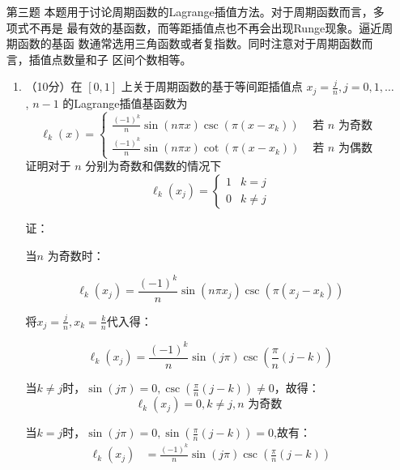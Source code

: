 \documentclass[12pt,a4paper,UTF8]{ctexart}
\theoremstyle{nonumberplain}
\begin{document}
\begin{enumerate}
\begin{enumerate}
          \end{enumerate}
    \item[第三题] 本题用于讨论周期函数的Lagrange插值方法。对于周期函数而言，多项式不再是 最有效的基函数，而等距插值点也不再会出现Runge现象。逼近周期函数的基函 数通常选用三角函数或者复指数。同时注意对于周期函数而言，插值点数量和子
          区间个数相等。
          \begin{enumerate}\item （10分）在 $[0,1]$ 上关于周期函数的基于等间距插值点 $x_{j}=\frac{j}{n}, j=0,1, \ldots$, $n-1$ 的Lagrange插值基函数为
                    $$
                        \ell_{k}(x)=\left\{\begin{array}{ll}
                            \frac{(-1)^{k}}{n} \sin (n \pi x) \csc \left(\pi\left(x-x_{k}\right)\right) & \text { 若 } n \text { 为奇数 } \\
                            \frac{(-1)^{k}}{n} \sin (n \pi x) \cot \left(\pi\left(x-x_{k}\right)\right) & \text { 若 } n \text { 为偶数 }
                        \end{array}\right.
                    $$
                    证明对于 $n$ 分别为奇数和偶数的情况下
                    $$
                        \ell_{k}\left(x_{j}\right)=\left\{\begin{array}{ll}
                            1 & k=j      \\
                            0 & k \neq j
                        \end{array}\right.
                    $$
                    \par 证：
                    \par 当$n$ 为奇数时：
                    \par $$\ell_{k}\left(x_{j}\right)=\frac{(-1)^{k}}{n} \sin (n \pi x_{j}) \csc \left(\pi\left(x_{j}-x_{k}\right)\right)$$
                    \par 将$x_{j}=\frac{j}{n},x_{k}=\frac{k}{n}$代入得：
                    \par $$\ell_{k}\left(x_{j}\right)=\frac{(-1)^{k}}{n} \sin (j \pi ) \csc \left(\frac{\pi}{n}\left(j-k\right)\right)$$
                    \par 当$k \neq j$时，$\sin (j \pi )=0,\csc \left(\frac{\pi}{n}\left(j-k\right)\right)\neq 0$，故得：
                    $$\ell_{k}\left(x_{j}\right)=0,k \neq j,n \text { 为奇数 }$$
                    \par 当$k=j$时，$\sin (j \pi )=0,\sin \left(\frac{\pi}{n}\left(j-k\right)\right)= 0$,故有：
                    $$\begin{aligned}\ell_{k}\left(x_{j}\right) & =\frac{(-1)^{k}}{n} \sin (j \pi ) \csc \left(\frac{\pi}{n}\left(j-k\right)\right)                                   \\

\end{aligned}$$
\end{enumerate}
\end{enumerate}
\end{document}
